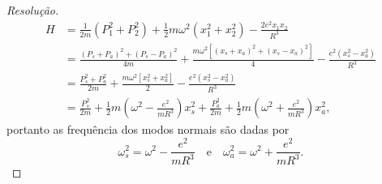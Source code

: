 \begin{proof}[Resolução]
    \begin{align*}
        H &= \frac{1}{2m}(P_1^2 + P_2^2) + \frac12 m \omega^2(x_1^2 + x_2^2) - \frac{2e^2x_1x_2}{R^3}\\
          &= \frac{(P_s + P_a)^2 + (P_s - P_a)^2}{4m} + \frac{m \omega^2\left[(x_s + x_a)^2 + (x_s - x_a)^2\right]}4  -\frac{e^2(x_s^2 - x_a^2)}{R^3}\\
          &= \frac{P_s^2 + P_a^2}{2m} + \frac{m \omega^2\left[x_s^2 + x_a^2\right]}2  -\frac{e^2(x_s^2 - x_a^2)}{R^3}\\
          &= \frac{P_s^2}{2m} + \frac12m\left(\omega^2 - \frac{e^2}{mR^3}\right)x_s^2 + \frac{P_a^2}{2m} + \frac12 m\left(\omega^2 + \frac{e^2}{m R^3}\right)x_a^2,
    \end{align*}
    portanto as frequência dos modos normais são dadas por
    \begin{equation*}
        \omega_s^2 = \omega^2 - \frac{e^2}{mR^3}\quad\text{e}\quad\omega_a^2 = \omega^2 + \frac{e^2}{m R^3}.
    \end{equation*}
\end{proof}
